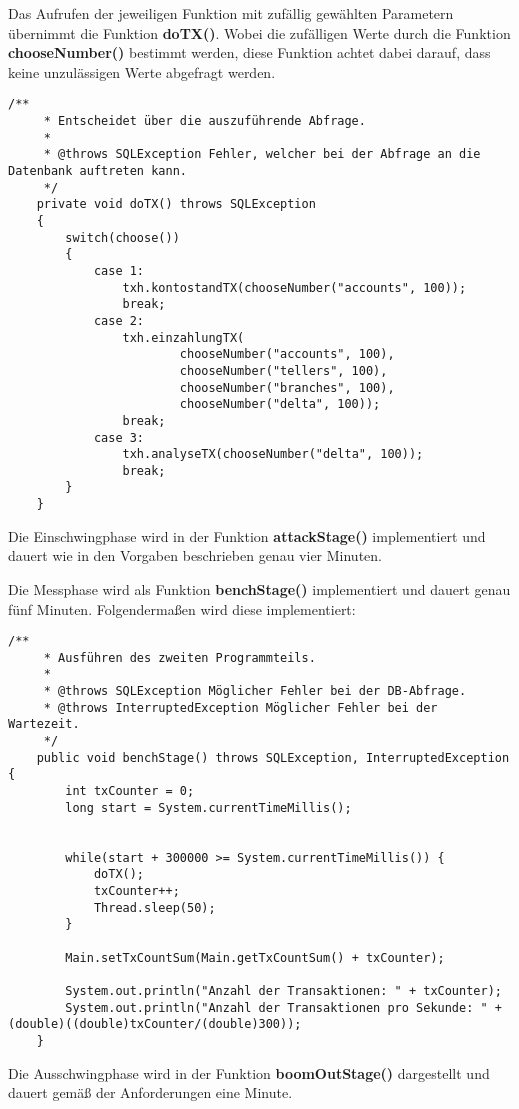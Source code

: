 Das Aufrufen der jeweiligen Funktion mit zufällig gewählten Parametern
übernimmt die Funktion \textbf{doTX()}. Wobei die zufälligen Werte durch die
Funktion \textbf{chooseNumber()} bestimmt werden, diese Funktion achtet dabei
darauf, dass keine unzulässigen Werte abgefragt werden.


\begin{lstlisting}[caption={doTX-Funktion in ProgramStage.java}]
	/**
	 * Entscheidet über die auszuführende Abfrage.
	 * 
	 * @throws SQLException Fehler, welcher bei der Abfrage an die Datenbank auftreten kann.
	 */
	private void doTX() throws SQLException
	{
		switch(choose())
		{
			case 1:
				txh.kontostandTX(chooseNumber("accounts", 100));
				break;
			case 2:
				txh.einzahlungTX(
						chooseNumber("accounts", 100),
						chooseNumber("tellers", 100),
						chooseNumber("branches", 100),
						chooseNumber("delta", 100));
				break;
			case 3:
				txh.analyseTX(chooseNumber("delta", 100));
				break;
		}
	}
\end{lstlisting}

Die Einschwingphase wird in der Funktion \textbf{attackStage()} implementiert
und dauert wie in den Vorgaben beschrieben genau vier Minuten.

\clearpage

Die Messphase wird als Funktion \textbf{benchStage()} implementiert und dauert
genau fünf Minuten. Folgendermaßen wird diese implementiert:
\begin{lstlisting}[caption={benchStage-Funktion in ProgramStage.java}]
	/**
	 * Ausführen des zweiten Programmteils.
	 * 
	 * @throws SQLException Möglicher Fehler bei der DB-Abfrage.
	 * @throws InterruptedException Möglicher Fehler bei der Wartezeit.
	 */
	public void benchStage() throws SQLException, InterruptedException {
		int txCounter = 0;
		long start = System.currentTimeMillis();
		
		
		while(start + 300000 >= System.currentTimeMillis()) {
			doTX();
			txCounter++;
			Thread.sleep(50);	
		}
		
		Main.setTxCountSum(Main.getTxCountSum() + txCounter);
		
		System.out.println("Anzahl der Transaktionen: " + txCounter);
		System.out.println("Anzahl der Transaktionen pro Sekunde: " + (double)((double)txCounter/(double)300));
	}
\end{lstlisting}

Die Ausschwingphase wird in der Funktion \textbf{boomOutStage()} dargestellt und
dauert gemäß der Anforderungen eine Minute.

